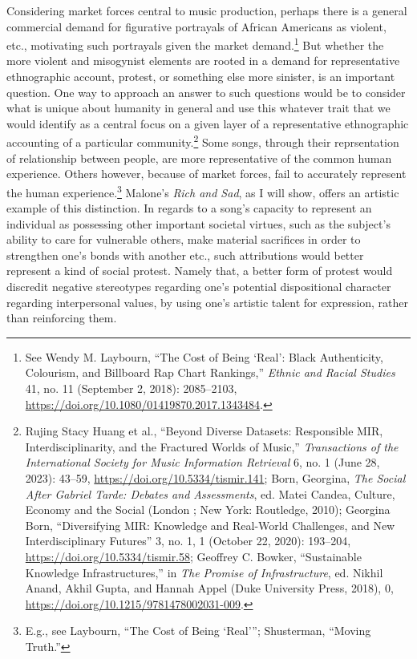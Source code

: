 \documentclass[
  12pt,
]{book}
\theoremstyle{definition}
\theoremstyle{definition}
\theoremstyle{definition}
\theoremstyle{definition}
\theoremstyle{remark}
\begin{document}
Considering market forces central to music production, perhaps there is a general commercial demand for figurative portrayals of African Americans as violent, etc., motivating such portrayals given the market demand.\footnote{See Wendy M. Laybourn, {``The Cost of Being {`Real'}: Black Authenticity, Colourism, and {Billboard Rap Chart} Rankings,''} \emph{Ethnic and Racial Studies} 41, no. 11 (September 2, 2018): 2085--2103, \url{https://doi.org/10.1080/01419870.2017.1343484}.} But whether the more violent and misogynist elements are rooted in a demand for representative ethnographic account, protest, or something else more sinister, is an important question. One way to approach an answer to such questions would be to consider what is unique about humanity in general and use this whatever trait that we would identify as a central focus on a given layer of a representative ethnographic accounting of a particular community.\footnote{Rujing Stacy Huang et al., {``Beyond {Diverse Datasets}: {Responsible MIR}, {Interdisciplinarity}, and the {Fractured Worlds} of {Music},''} \emph{Transactions of the International Society for Music Information Retrieval} 6, no. 1 (June 28, 2023): 43--59, \url{https://doi.org/10.5334/tismir.141}; Born, Georgina, \emph{The Social After {Gabriel Tarde}: Debates and Assessments}, ed. Matei Candea, Culture, Economy and the Social (London ; New York: Routledge, 2010); Georgina Born, {``Diversifying {MIR}: {Knowledge} and {Real-World Challenges}, and {New Interdisciplinary Futures}''} 3, no. 1, 1 (October 22, 2020): 193--204, \url{https://doi.org/10.5334/tismir.58}; Geoffrey C. Bowker, {``Sustainable {Knowledge Infrastructures},''} in \emph{The {Promise} of {Infrastructure}}, ed. Nikhil Anand, Akhil Gupta, and Hannah Appel (Duke University Press, 2018), 0, \url{https://doi.org/10.1215/9781478002031-009}.} Some songs, through their reprsentation of relationship between people, are more representative of the common human experience. Others however, because of market forces, fail to accurately represent the human experience.\footnote{E.g., see Laybourn, {``The Cost of Being {`Real'}''}; Shusterman, {``Moving {Truth}.''}} Malone's \emph{Rich and Sad}, as I will show, offers an artistic example of this distinction. In regards to a song's capacity to represent an individual as possessing other important societal virtues, such as the subject's ability to care for vulnerable others, make material sacrifices in order to strengthen one's bonds with another etc., such attributions would better represent a kind of social protest. Namely that, a better form of protest would discredit negative stereotypes regarding one's potential dispositional character regarding interpersonal values, by using one's artistic talent for expression, rather than reinforcing them.
\end{document}
